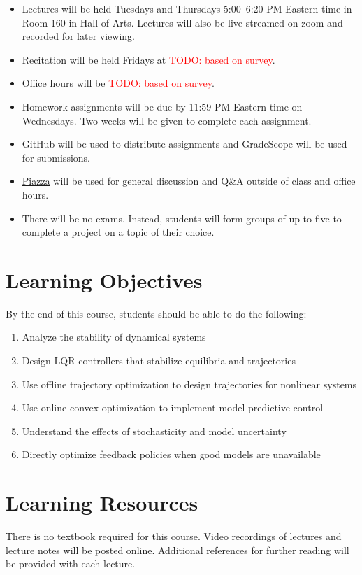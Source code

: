 \documentclass[11pt,letterpaper]{article}
\newcommand{\todo}[1]{\textcolor{red}{TODO: #1}}
\begin{document}
\begin{itemize}
	\item Lectures will be held Tuesdays and Thursdays 5:00--6:20 PM Eastern time in Room 160 in Hall of Arts. Lectures will also be live streamed on zoom and recorded for later viewing.
	\item Recitation will be held Fridays at \todo{based on survey}.
	\item Office hours will be \todo{based on survey}.
	\item Homework assignments will be due by 11:59 PM Eastern time on Wednesdays. Two weeks will be given to complete each assignment.
	\item GitHub will be used to distribute assignments and GradeScope will be used for submissions.
	\item \href{https://piazza.com/cmu/spring2023/16745/home}{Piazza} will be used for general discussion and Q\&A outside of class and office hours.
	\item There will be no exams. Instead, students will form groups of up to five to complete a project on a topic of their choice.
\end{itemize}

\section*{Learning Objectives}
By the end of this course, students should be able to do the following:
\begin{enumerate}
	\item Analyze the stability of dynamical systems
	\item Design LQR controllers that stabilize equilibria and trajectories
	\item Use offline trajectory optimization to design trajectories for nonlinear systems
	\item Use online convex optimization to implement model-predictive control
	\item Understand the effects of stochasticity and model uncertainty
	\item Directly optimize feedback policies when good models are unavailable
\end{enumerate}

\section*{Learning Resources}

There is no textbook required for this course. Video recordings of lectures and lecture notes will be posted online. Additional references for further reading will be provided with each lecture.
\end{document}

